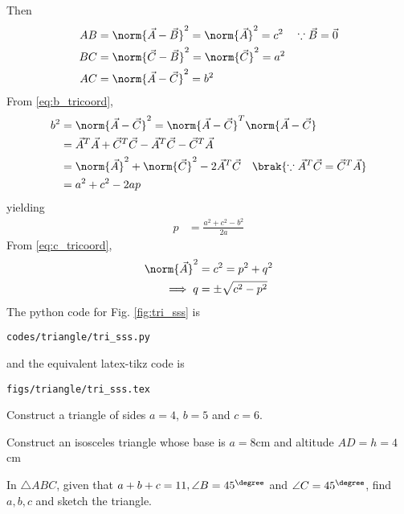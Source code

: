 Then
\begin{align}
\label{eq:c_tricoord}
AB &= \norm{\vec{A}-\vec{B}}^2 = \norm{\vec{A}}^2  = c^2 \quad \because \vec{B} = \vec{0}
\\
\label{eq:a_tricoord}
BC &= \norm{\vec{C}-\vec{B}}^2 = \norm{\vec{C}}^2  = a^2
\\
AC &= \norm{\vec{A}-\vec{C}}^2 =    b^2
\label{eq:b_tricoord}
\end{align}
%
From \eqref{eq:b_tricoord},
\begin{align}
b^2 &=\norm{\vec{A}-\vec{C}}^2 = \norm{\vec{A}-\vec{C}}^T\norm{\vec{A}-\vec{C}}  
\\
&= \vec{A}^T\vec{A}+\vec{C}^T\vec{C}-\vec{A}^T\vec{C} - \vec{C}^T\vec{A} 
\\
&= \norm{\vec{A}}^2 + \norm{\vec{C}}^2 - 2\vec{A}^T\vec{C} \quad \brak{\because \vec{A}^T\vec{C} = \vec{C}^T\vec{A} } 
\label{eq:tri_const_norm_ac}
\\
&= a^2+c^2-2ap
\end{align}
%
yielding
\begin{align}
p&= \frac{a^2+c^2-b^2}{2a}
\end{align}
%
From \eqref{eq:c_tricoord}, 
\begin{align}
\norm{\vec{A}}^2 &= c^2 = p^2+q^2
\\
\implies q&= \pm \sqrt{c^2-p^2}
\end{align}
%
The python code for  Fig. \ref{fig:tri_sss} is
\begin{lstlisting}
codes/triangle/tri_sss.py
\end{lstlisting}
%
and the equivalent latex-tikz code is
%
\begin{lstlisting}
figs/triangle/tri_sss.tex
\end{lstlisting}

\item Construct a triangle of sides $a=4$, $b=5$  and $c=6$.  
\\
\solution


\item Construct an isosceles triangle whose base is $a=8$cm and altitude $AD=h=4$cm 
\\
\solution


\item In $\triangle ABC$,  given that $a+b+c = 11, \angle B = 45^{\degree}$ and $\angle C = 45^{\degree}$, 
find 
$a,b,c$ and sketch the triangle.
\\
\solution


